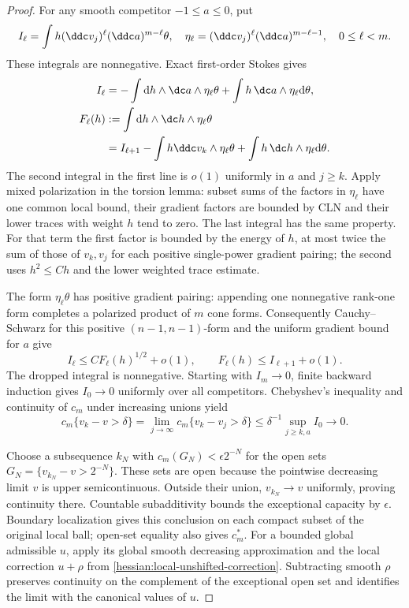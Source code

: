 \begin{proof}
For any smooth competitor $-1\leq a\leq0$, put
\[
 I_\ell=\int h(\ddc v_j)^\ell(\ddc a)^{m-\ell}\theta,\quad
 \eta_\ell=(\ddc v_j)^\ell(\ddc a)^{m-\ell-1},\quad0\leq\ell<m.
\]
These integrals are nonnegative. Exact first-order Stokes gives
\[
 \begin{aligned}
 I_\ell&=-\int\mathrm dh\wedge\dc a\wedge\eta_\ell\theta
             +\int h\,\dc a\wedge\eta_\ell\mathrm d\theta,\\
 F_\ell(h)&:=\int\mathrm dh\wedge\dc h\wedge\eta_\ell\theta\\
 &=I_{\ell+1}-\int h\ddc v_k\wedge\eta_\ell\theta
                +\int h\,\dc h\wedge\eta_\ell\mathrm d\theta.
 \end{aligned}
\]
The second integral in the first line is $o(1)$ uniformly in $a$ and
$j\geq k$. Apply mixed polarization in the torsion lemma: subset
sums of the factors in $\eta_\ell$ have one common local bound,
their gradient factors are bounded by CLN and their lower traces
with weight $h$ tend to zero. The last integral has the same
property. For that term the first factor is bounded by the energy
of $h$, at most twice the sum of those of $v_k,v_j$ for each
positive single-power gradient pairing; the second uses
$h^2\leq C h$ and the lower weighted trace estimate.

The form $\eta_\ell\theta$ has positive gradient pairing: appending
one nonnegative rank-one form completes a polarized product of
$m$ cone forms. Consequently Cauchy--Schwarz for this positive
$(n-1,n-1)$-form and the uniform gradient bound for $a$ give
\[
 I_\ell\leq C F_\ell(h)^{1/2}+o(1),\qquad
 F_\ell(h)\leq I_{\ell+1}+o(1).
\]
The dropped integral is nonnegative. Starting with $I_m\to0$,
finite backward induction gives $I_0\to0$ uniformly over all
competitors. Chebyshev's inequality and continuity of $c_m$ under
increasing unions yield
\[
 c_m\{v_k-v>\delta\}
   =\lim_{j\to\infty}c_m\{v_k-v_j>\delta\}
   \leq\delta^{-1}\sup_{j\geq k,a}I_0\longrightarrow0.
\]

Choose a subsequence $k_N$ with
$c_m(G_N)<\epsilon2^{-N}$ for the open sets
$G_N=\{v_{k_N}-v>2^{-N}\}$. These sets are open because the
pointwise decreasing limit $v$ is upper semicontinuous.
Outside their union, $v_{k_N}\to v$ uniformly, proving continuity
there. Countable subadditivity bounds the exceptional capacity by
$\epsilon$. Boundary localization gives this conclusion on each
compact subset of the original local ball; open-set equality also
gives $c_m^*$. For a bounded global admissible $u$, apply its global
smooth decreasing approximation and the local correction $u+\rho$
from \cref{hessian:local-unshifted-correction}. Subtracting smooth
$\rho$ preserves continuity on the complement of the exceptional
open set and identifies the limit with the canonical values of $u$.
\end{proof}

